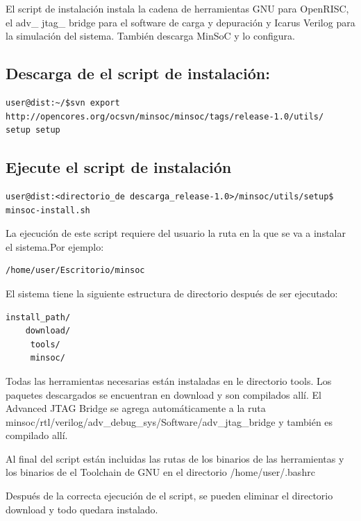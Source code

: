 El script de instalación instala la cadena de herramientas GNU para OpenRISC, el adv\_ jtag\_ bridge para el software de carga y depuración y Icarus Verilog para la simulación del sistema. También descarga MinSoC y lo configura.
 

\subsection{Descarga de el script de instalación:}

\begin{lstlisting}[breaklines]
 user@dist:~/$svn export http://opencores.org/ocsvn/minsoc/minsoc/tags/release-1.0/utils/
setup setup
\end{lstlisting}

\subsection{Ejecute el script de instalación}

\begin{lstlisting}[breaklines]
user@dist:<directorio_de descarga_release-1.0>/minsoc/utils/setup$ minsoc-install.sh
\end{lstlisting}

La ejecución de este script requiere del usuario la ruta en la que se va a instalar el sistema.Por ejemplo:

\begin{lstlisting}[breaklines]
/home/user/Escritorio/minsoc
\end{lstlisting}

El sistema tiene la siguiente estructura de directorio después de ser ejecutado: 
\begin{lstlisting}[breaklines]
install_path/
	download/
	 tools/
 	 minsoc/
\end{lstlisting}

Todas las herramientas necesarias están instaladas en le directorio tools. Los paquetes descargados se encuentran en download y son compilados allí. El Advanced JTAG Bridge se agrega automáticamente a la ruta minsoc/rtl/verilog/adv\_debug\_sys/Software/adv\_jtag\_bridge  y también es compilado allí. 

Al final del script están incluidas las rutas de los binarios de las herramientas y los  binarios de el Toolchain de GNU en el directorio /home/user/.bashrc
 
Después de la correcta ejecución de el script, se pueden eliminar el directorio download y todo quedara instalado.

